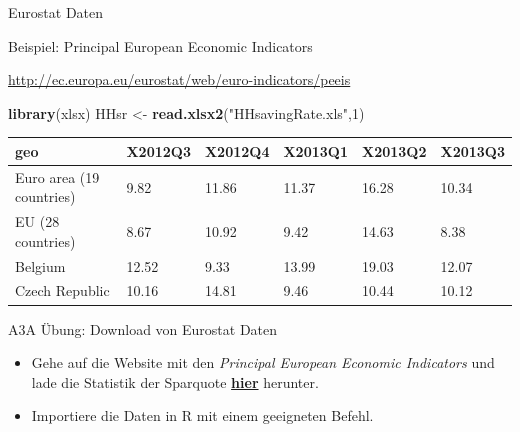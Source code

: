 \documentclass[ignorenonframetext,]{beamer}
\newenvironment{Shaded}{\begin{snugshade}}{\end{snugshade}}
\newcommand{\DecValTok}[1]{\textcolor[rgb]{0.00,0.00,0.81}{#1}}
\newcommand{\KeywordTok}[1]{\textcolor[rgb]{0.13,0.29,0.53}{\textbf{#1}}}
\newcommand{\NormalTok}[1]{#1}
\newcommand{\StringTok}[1]{\textcolor[rgb]{0.31,0.60,0.02}{#1}}
\providecommand{\tightlist}{%
  \setlength{\itemsep}{0pt}\setlength{\parskip}{0pt}}
\begin{document}
\begin{frame}[fragile]{Eurostat Daten}
\protect\hypertarget{eurostat-daten}{}

\begin{block}{Beispiel: Principal European Economic Indicators}

\url{http://ec.europa.eu/eurostat/web/euro-indicators/peeis}

\begin{Shaded}
\begin{Highlighting}[]
\KeywordTok{library}\NormalTok{(xlsx)}
\NormalTok{HHsr <-}\StringTok{ }\KeywordTok{read.xlsx2}\NormalTok{(}\StringTok{"HHsavingRate.xls"}\NormalTok{,}\DecValTok{1}\NormalTok{)}
\end{Highlighting}
\end{Shaded}

\begin{longtable}[]{@{}llllll@{}}
\toprule
geo & X2012Q3 & X2012Q4 & X2013Q1 & X2013Q2 & X2013Q3\tabularnewline
\midrule
\endhead
Euro area (19 countries) & 9.82 & 11.86 & 11.37 & 16.28 &
10.34\tabularnewline
EU (28 countries) & 8.67 & 10.92 & 9.42 & 14.63 & 8.38\tabularnewline
Belgium & 12.52 & 9.33 & 13.99 & 19.03 & 12.07\tabularnewline
Czech Republic & 10.16 & 14.81 & 9.46 & 10.44 & 10.12\tabularnewline
\bottomrule
\end{longtable}

\end{block}

\end{frame}

\begin{frame}{A3A Übung: Download von Eurostat Daten}
\protect\hypertarget{a3a-ubung-download-von-eurostat-daten}{}

\begin{itemize}
\tightlist
\item
  Gehe auf die Website mit den \emph{Principal European Economic
  Indicators} und lade die Statistik der Sparquote
  \href{http://ec.europa.eu/eurostat/web/euro-indicators/peeis}{\textbf{hier}}
  herunter.
\item
  Importiere die Daten in R mit einem geeigneten Befehl.
\end{itemize}

\end{frame}
\end{document}
